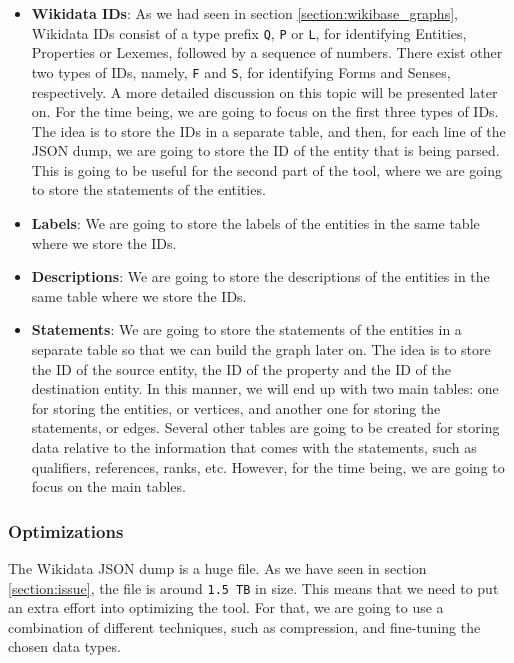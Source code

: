 \begin{itemize}
    \itemsep0.5em
    \item \textbf{Wikidata IDs}: As we had seen in section \ref{section:wikibase_graphs}, Wikidata IDs consist of a type prefix \texttt{Q}, \texttt{P} or \texttt{L}, for identifying Entities, Properties or Lexemes, followed by a sequence of numbers. There exist other two types of IDs, namely, \texttt{F} and \texttt{S}, for identifying Forms and Senses, respectively. A more detailed discussion on this topic will be presented later on. For the time being, we are going to focus on the first three types of IDs. The idea is to store the IDs in a separate table, and then, for each line of the JSON dump, we are going to store the ID of the entity that is being parsed. This is going to be useful for the second part of the tool, where we are going to store the statements of the entities.
    \item \textbf{Labels}: We are going to store the labels of the entities in the same table where we store the IDs.
    \item \textbf{Descriptions}: We are going to store the descriptions of the entities in the same table where we store the IDs.
    \item \textbf{Statements}: We are going to store the statements of the entities in a separate table so that we can build the graph later on. The idea is to store the ID of the source entity, the ID of the property and the ID of the destination entity. In this manner, we will end up with two main tables: one for storing the entities, or vertices, and another one for storing the statements, or edges. Several other tables are going to be created for storing data relative to the information that comes with the statements, such as qualifiers, references, ranks, etc. However, for the time being, we are going to focus on the main tables.
\end{itemize}

\subsubsection{Optimizations}

The Wikidata JSON dump is a huge file. As we have seen in section \ref{section:issue}, the file is around \texttt{1.5 TB} in size. This means that we need to put an extra effort into optimizing the tool. For that, we are going to use a combination of different techniques, such as compression, and fine-tuning the chosen data types.


